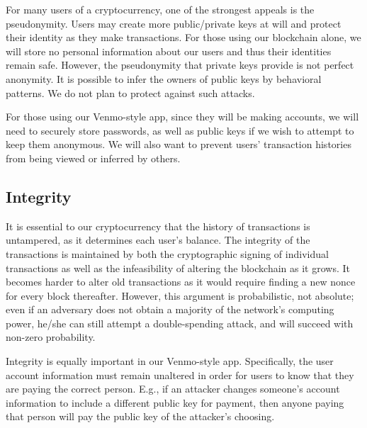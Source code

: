 \documentclass[12pt]{article}
\begin{document}
For many users of a cryptocurrency, one of the strongest appeals is the pseudonymity.
Users may create more public/private keys at will and protect their identity as they make transactions.
For those using our blockchain alone, we will store no personal information about our users and thus their identities remain safe.
However, the pseudonymity that private keys provide is not perfect anonymity. It is possible to infer the owners of public keys by behavioral patterns. We do not plan to protect against such attacks.


For those using our Venmo-style app, since they will be making accounts, we will need to securely store passwords, as well as public keys if we wish to attempt to keep them anonymous.
We will also want to prevent users' transaction histories from being viewed or inferred by others.

\subsection{Integrity}

It is essential to our cryptocurrency that the history of transactions is untampered, as it determines each user's balance.
The integrity of the transactions is maintained by both the cryptographic signing of individual transactions as well as the infeasibility of altering the blockchain as it grows.
It becomes harder to alter old transactions as it would require finding a new nonce for every block thereafter.
However, this argument is probabilistic, not absolute; even if an adversary does not obtain a majority of the network's computing power, he/she can still attempt a double-spending attack, and will succeed with non-zero probability.

Integrity is equally important in our Venmo-style app.
Specifically, the user account information must remain unaltered in order for users to know that they are paying the correct person.
E.g., if an attacker changes someone's account information to include a different public key for payment, then anyone paying that person will pay the public key of the attacker's choosing.
\end{document}
